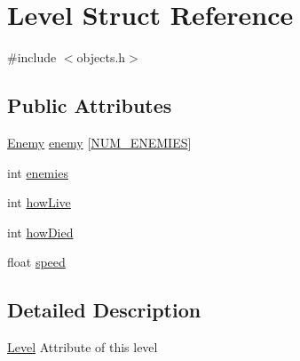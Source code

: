 \hypertarget{struct_level}{\section{Level Struct Reference}
\label{struct_level}
}


{\ttfamily \#include $<$objects.\-h$>$}

\subsection*{Public Attributes}
\begin{DoxyCompactItemize}
\item 
\hyperlink{struct_enemy}{Enemy} \hyperlink{struct_level_abc0fd066888f1eb4ccbac8ae8db9dd59}{enemy} \mbox{[}\hyperlink{objects_8h_a596387dc3944cab7dbec11291cb8bf0e}{N\-U\-M\-\_\-\-E\-N\-E\-M\-I\-E\-S}\mbox{]}
\item 
int \hyperlink{struct_level_a263c12b29dad8ef036f22afe3a698f71}{enemies}
\item 
int \hyperlink{struct_level_a69256998056f0c8d34e66dbf7e9340c5}{how\-Live}
\item 
int \hyperlink{struct_level_adebb63051bd8830503afe734f38dac34}{how\-Died}
\item 
float \hyperlink{struct_level_a936a1d131d1e056878474ca831c5e88f}{speed}
\end{DoxyCompactItemize}


\subsection{Detailed Description}
\hyperlink{struct_level}{Level} Attribute of this level 

